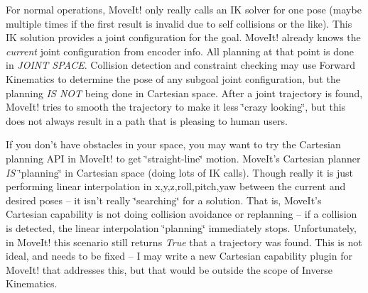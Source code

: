 For normal operations, Move\-It! only really calls an I\-K solver for one pose (maybe multiple times if the first result is invalid due to self collisions or the like). This I\-K solution provides a joint configuration for the goal. Move\-It! already knows the {\itshape current} joint configuration from encoder info. All planning at that point is done in {\itshape J\-O\-I\-N\-T S\-P\-A\-C\-E}. Collision detection and constraint checking may use Forward Kinematics to determine the pose of any subgoal joint configuration, but the planning {\itshape I\-S N\-O\-T} being done in Cartesian space. After a joint trajectory is found, Move\-It! tries to smooth the trajectory to make it less \char`\"{}crazy looking\char`\"{}, but this does not always result in a path that is pleasing to human users.

If you don't have obstacles in your space, you may want to try the Cartesian planning A\-P\-I in Move\-It! to get \char`\"{}straight-\/line\char`\"{} motion. Move\-It's Cartesian planner {\itshape I\-S} \char`\"{}planning\char`\"{} in Cartesian space (doing lots of I\-K calls). Though really it is just performing linear interpolation in x,y,z,roll,pitch,yaw between the current and desired poses -- it isn't really \char`\"{}searching\char`\"{} for a solution. That is, Move\-It's Cartesian capability is not doing collision avoidance or replanning -- if a collision is detected, the linear interpolation \char`\"{}planning\char`\"{} immediately stops. Unfortunately, in Move\-It! this scenario still returns {\itshape True} that a trajectory was found. This is not ideal, and needs to be fixed -- I may write a new Cartesian capability plugin for Move\-It! that addresses this, but that would be outside the scope of Inverse Kinematics. 